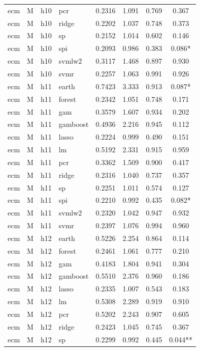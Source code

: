\begin{ThreePartTable}
\begin{longtable}[t]{llclcccc}
ecm & M & h10 & pcr & 0.2316 & 1.091 & 0.769 & 0.367\\
ecm & M & h10 & ridge & 0.2202 & 1.037 & 0.748 & 0.373\\
ecm & M & h10 & sp & 0.2152 & 1.014 & 0.602 & 0.146\\
ecm & M & h10 & spi & 0.2093 & 0.986 & 0.383 & 0.086*\\
ecm & M & h10 & svmlw2 & 0.3117 & 1.468 & 0.897 & 0.930\\
ecm & M & h10 & svmr & 0.2257 & 1.063 & 0.991 & 0.926\\
\addlinespace
ecm & M & h11 & earth & 0.7423 & 3.333 & 0.913 & 0.087*\\
ecm & M & h11 & forest & 0.2342 & 1.051 & 0.748 & 0.171\\
ecm & M & h11 & gam & 0.3579 & 1.607 & 0.934 & 0.202\\
ecm & M & h11 & gamboost & 0.4936 & 2.216 & 0.945 & 0.112\\
ecm & M & h11 & lasso & 0.2224 & 0.999 & 0.490 & 0.151\\
ecm & M & h11 & lm & 0.5192 & 2.331 & 0.915 & 0.959\\
ecm & M & h11 & pcr & 0.3362 & 1.509 & 0.900 & 0.417\\
ecm & M & h11 & ridge & 0.2316 & 1.040 & 0.737 & 0.357\\
ecm & M & h11 & sp & 0.2251 & 1.011 & 0.574 & 0.127\\
ecm & M & h11 & spi & 0.2210 & 0.992 & 0.435 & 0.082*\\
ecm & M & h11 & svmlw2 & 0.2320 & 1.042 & 0.947 & 0.932\\
ecm & M & h11 & svmr & 0.2397 & 1.076 & 0.994 & 0.960\\
\addlinespace
ecm & M & h12 & earth & 0.5226 & 2.254 & 0.864 & 0.114\\
ecm & M & h12 & forest & 0.2461 & 1.061 & 0.777 & 0.210\\
ecm & M & h12 & gam & 0.4183 & 1.804 & 0.941 & 0.304\\
ecm & M & h12 & gamboost & 0.5510 & 2.376 & 0.960 & 0.186\\
ecm & M & h12 & lasso & 0.2335 & 1.007 & 0.543 & 0.183\\
ecm & M & h12 & lm & 0.5308 & 2.289 & 0.919 & 0.910\\
ecm & M & h12 & pcr & 0.5202 & 2.243 & 0.907 & 0.605\\
ecm & M & h12 & ridge & 0.2423 & 1.045 & 0.745 & 0.367\\
ecm & M & h12 & sp & 0.2299 & 0.992 & 0.445 & 0.044**\\

\end{longtable}
\end{ThreePartTable}
